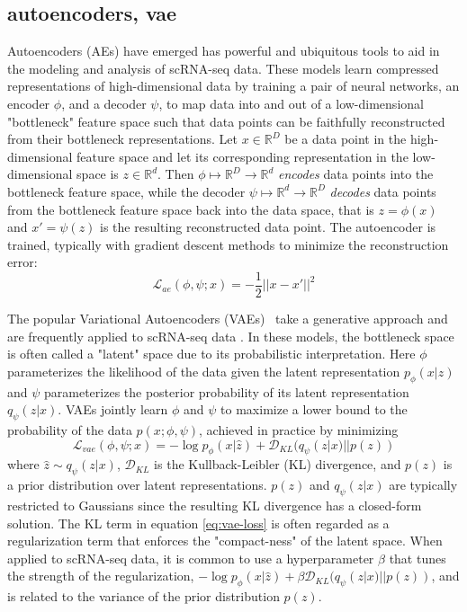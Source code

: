 \subsection{autoencoders, vae}
Autoencoders (AEs) have emerged has powerful and ubiquitous tools to aid in the modeling and analysis of scRNA-seq data.
These models learn compressed representations of high-dimensional data by training a pair of neural networks, an encoder $\phi$, and a decoder $\psi$,
to map data into and out of a low-dimensional "bottleneck" feature space such that data points can be faithfully reconstructed from their bottleneck representations.
Let $x \in \mathbb{R}^D$ be a data point in the high-dimensional feature space and let its corresponding representation in the low-dimensional space is $z \in \mathbb{R}^d$.
Then $\phi \mapsto \mathbb{R}^D \to \mathbb{R}^d$ \emph{encodes} data points into the bottleneck feature space,
while the decoder $\psi \mapsto \mathbb{R}^d \to \mathbb{R}^D$ \emph{decodes} data points from the bottleneck feature space back into the data space,
that is $z = \phi(x)$ and $x\prime = \psi(z)$ is the resulting reconstructed data point.
The autoencoder is trained, typically with gradient descent methods \cite{kingma2017} to minimize the reconstruction error:
\begin{equation}
  \mathcal{L}_{ae}(\phi, \psi; x) = -\frac{1}{2} || x - x\prime ||^2
  \label{eq:ae-loss}
\end{equation}

The popular Variational Autoencoders (VAEs)~\citep{kingma2013} take a generative approach and are frequently applied to scRNA-seq data \cite{lopez2018, huang2018, eraslan2019, lotfollahi2019}.
In these models, the bottleneck space is often called a "latent" space due to its probabilistic interpretation.
Here $\phi$ parameterizes the likelihood of the data given the latent representation $p_\phi(x|z)$ and $\psi$ parameterizes the posterior probability of its latent representation $q_\psi(z|x)$.
VAEs jointly learn $\phi$ and $\psi$ to maximize a lower bound to the probability of the data $p(x; \phi, \psi)$, achieved in practice by minimizing
\begin{equation}
    \mathcal{L}_{vae}(\phi, \psi; x) = -\log p_\phi(x | \hat{z}) + \mathcal{D}_{KL}(q_\psi(z|x) || p(z))
    \label{eq:vae-loss}
\end{equation}
where $\hat{z} \sim q_\psi(z|x)$, $\mathcal{D}_{KL}$ is the Kullback-Leibler (KL) divergence,
and $p(z)$ is a prior distribution over latent representations.
$p(z)$ and $q_\psi(z|x)$ are typically restricted to Gaussians since the resulting KL divergence has a closed-form solution.
The KL term in equation \ref{eq:vae-loss} is often regarded as a regularization term that enforces the "compact-ness" of the latent space.
When applied to scRNA-seq data, it is common to use a hyperparameter $\beta$ that tunes the strength of the regularization, 
$-\log p_\phi(x | \hat{z}) + \beta \mathcal{D}_{KL}(q_\psi(z|x) || p(z))$,
and is related to the variance of the prior distribution $p(z)$.

